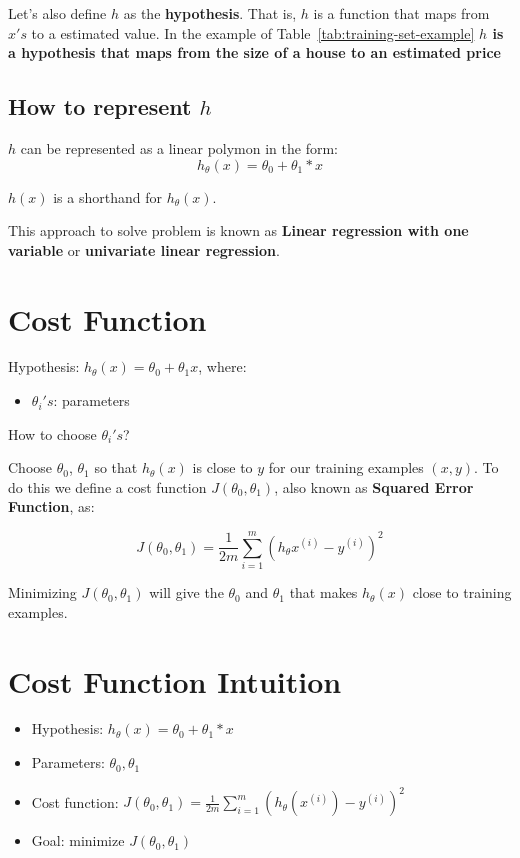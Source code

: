 \documentclass[a4paper]{article}
\begin{document}
Let's also define $h$ as the \textbf{hypothesis}. That is, $h$ is a function that maps from $x's$ to a estimated value. In the example of Table~\ref{tab:training-set-example} \textbf{$h$ is a hypothesis that maps from the size of a house to an estimated price}

\subsection{How to represent $h$}

$h$ can be represented as a linear polymon in the form:
\[h_\theta(x) = \theta_0 + \theta_1 * x\]

$h(x)$ is a shorthand for $h_\theta(x)$.

\medskip

This approach to solve problem is known as \textbf{Linear regression with one variable} or \textbf{univariate linear regression}.

\section{Cost Function}

Hypothesis: $h_\theta(x) = \theta_0 + \theta_1 x$, where:

\begin{itemize}
\item{$\theta_i's$: parameters}
\end{itemize}

How to choose $\theta_i's$?

\medskip

Choose $\theta_0$, $\theta_1$ so that $h_\theta(x)$ is close to $y$ for our training examples $(x,y)$. To do this we define a cost function $J(\theta_0, \theta_1)$, also known as \textbf{Squared Error Function}, as:

\[J(\theta_0, \theta_1) = \frac{1}{2m}\sum_{i=1}^m(h_\theta x^{(i)}-y^{(i)})^2\]

Minimizing $J(\theta_0, \theta_1)$ will give the $\theta_0$ and $\theta_1$ that makes $h_\theta(x)$ close to training examples.

\section{Cost Function Intuition}
\begin{itemize}
\item Hypothesis: $h_\theta(x) = \theta_0 + \theta_1 * x$
\item Parameters: $\theta_0, \theta_1$
\item Cost function: $J(\theta_0,\theta_1) = \frac{1}{2m}\sum_{i=1}^{m}(h_\theta(x^{(i)}) - y^{(i)})^2$
\item Goal: minimize $J(\theta_0, \theta_1)$
\end{itemize}
\end{document}
